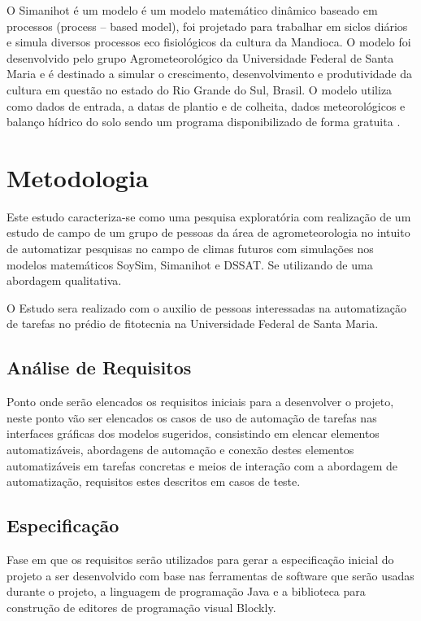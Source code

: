 \documentclass[12pt]{article}
\begin{document}
	O Simanihot é um modelo é um modelo matemático dinâmico baseado em processos (process – based model), foi projetado para trabalhar em siclos diários e simula diversos processos eco fisiológicos da cultura da Mandioca. O modelo foi desenvolvido pelo grupo Agrometeorológico da Universidade Federal de Santa Maria e é destinado a simular o crescimento, desenvolvimento e produtividade da cultura em questão no estado do Rio Grande do Sul, Brasil. O modelo utiliza como dados de entrada, a datas de plantio e de colheita, dados meteorológicos e balanço hídrico do solo sendo um programa disponibilizado de forma gratuita \cite{Simanihot}.
	
	\section{Metodologia}
	
	Este estudo caracteriza-se como uma pesquisa exploratória com realização de um estudo de campo de um grupo de pessoas da área de agrometeorologia no intuito de automatizar pesquisas no campo de climas futuros com simulações nos modelos matemáticos SoySim, Simanihot e DSSAT. Se utilizando de uma abordagem qualitativa.
	
	O Estudo sera realizado com o auxilio de pessoas interessadas na automatização de tarefas no prédio de fitotecnia na Universidade Federal de Santa Maria.

	\subsection{Análise de Requisitos}
	
	 Ponto onde serão elencados os requisitos iniciais para a desenvolver o projeto, neste ponto vão ser elencados os casos de uso de automação de tarefas nas interfaces gráficas dos modelos sugeridos, consistindo em elencar elementos automatizáveis, abordagens de automação e conexão destes elementos automatizáveis em tarefas concretas e meios de interação com a abordagem de automatização, requisitos estes descritos em casos de teste. 
	
	\subsection{Especificação}
	Fase em que os requisitos serão utilizados para gerar a especificação inicial do projeto a ser desenvolvido com base nas ferramentas de software que serão usadas durante o projeto, a linguagem de programação Java e a biblioteca para construção de editores de programação visual Blockly.
	
\end{document}
